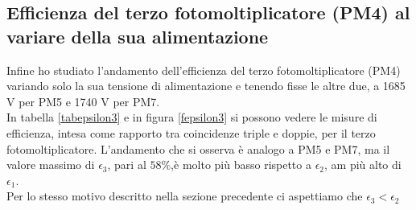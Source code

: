 \documentclass{article}
\begin{document}
\newpage
\subsection{Efficienza del terzo fotomoltiplicatore (PM4) al variare della sua alimentazione}
Infine ho studiato l'andamento dell'efficienza del terzo fotomoltiplicatore (PM4) variando solo la sua tensione di alimentazione e tenendo fisse le altre due, a 1685 V per PM5 e 1740 V per PM7.
\\
In tabella \ref{tabepsilon3} e in figura  \ref{fepsilon3}  si possono vedere le misure di efficienza, intesa come rapporto tra coincidenze triple e doppie, per il terzo fotomoltiplicatore. L'andamento che si osserva è analogo a PM5 e PM7, ma il valore massimo di $\epsilon_3$, pari al $58\%$,è molto più basso rispetto a $\epsilon_2$, am più alto di $\epsilon_1$.\\
Per lo stesso motivo descritto nella sezione precedente ci aspettiamo che $\epsilon_3 < \epsilon_2$
\end{document}
